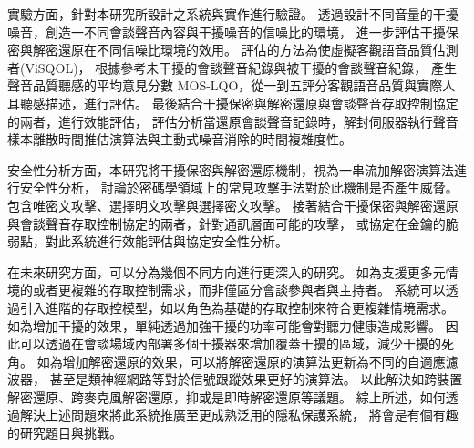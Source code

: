     實驗方面，針對本研究所設計之系統與實作進行驗證。
透過設計不同音量的干擾噪音，創造一不同會談聲音內容與干擾噪音的信噪比的環境，
進一步評估干擾保密與解密還原在不同信噪比環境的效用。
評估的方法為使虛擬客觀語音品質估測者(ViSQOL)，
根據參考未干擾的會談聲音紀錄與被干擾的會談聲音紀錄，
產生聲音品質聽感的平均意見分數 MOS-LQO，從一到五評分客觀語音品質與實際人耳聽感描述，進行評估。
最後結合干擾保密與解密還原與會談聲音存取控制協定的兩者，進行效能評估，
評估分析當還原會談聲音記錄時，解封伺服器執行聲音樣本離散時間推估演算法與主動式噪音消除的時間複雜度性。

    安全性分析方面，本研究將干擾保密與解密還原機制，視為一串流加解密演算法進行安全性分析，
討論於密碼學領域上的常見攻擊手法對於此機制是否產生威脅。
包含唯密文攻擊、選擇明文攻擊與選擇密文攻擊。
接著結合干擾保密與解密還原與會談聲音存取控制協定的兩者，針對通訊層面可能的攻擊，
或協定在金鑰的脆弱點，對此系統進行效能評估與協定安全性分析。

    在未來研究方面，可以分為幾個不同方向進行更深入的研究。
如為支援更多元情境的或者更複雜的存取控制需求，而非僅區分會談參與者與主持者。
系統可以透過引入進階的存取控模型，如以角色為基礎的存取控制來符合更複雜情境需求。
如為增加干擾的效果，單純透過加強干擾的功率可能會對聽力健康造成影響。
因此可以透過在會談場域內部署多個干擾器來增加覆蓋干擾的區域，減少干擾的死角。
如為增加解密還原的效果，可以將解密還原的演算法更新為不同的自適應濾波器，
甚至是類神經網路等對於信號跟蹤效果更好的演算法。
以此解決如跨裝置解密還原、跨麥克風解密還原，抑或是即時解密還原等議題。
綜上所述，如何透過解決上述問題來將此系統推廣至更成熟泛用的隱私保護系統，
將會是有個有趣的研究題目與挑戰。